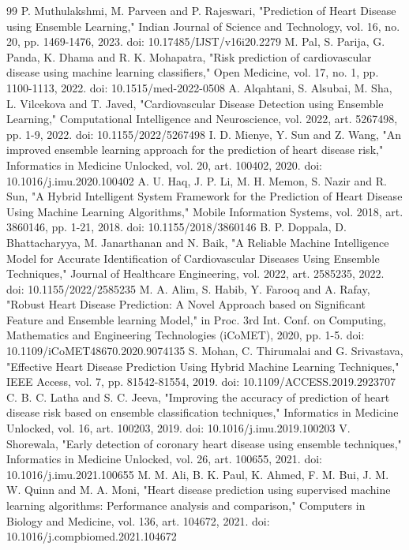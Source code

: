 \documentclass[conference,a4paper,10pt]{IEEEtran}
\begin{document}
\begin{thebibliography}{99}
 P. Muthulakshmi, M. Parveen and P. Rajeswari, "Prediction of Heart Disease using Ensemble Learning," Indian Journal of Science and Technology, vol. 16, no. 20, pp. 1469-1476, 2023. doi: 10.17485/IJST/v16i20.2279
 M. Pal, S. Parija, G. Panda, K. Dhama and R. K. Mohapatra, "Risk prediction of cardiovascular disease using machine learning classifiers," Open Medicine, vol. 17, no. 1, pp. 1100-1113, 2022. doi: 10.1515/med-2022-0508
 A. Alqahtani, S. Alsubai, M. Sha, L. Vilcekova and T. Javed, "Cardiovascular Disease Detection using Ensemble Learning," Computational Intelligence and Neuroscience, vol. 2022, art. 5267498, pp. 1-9, 2022. doi: 10.1155/2022/5267498
 I. D. Mienye, Y. Sun and Z. Wang, "An improved ensemble learning approach for the prediction of heart disease risk," Informatics in Medicine Unlocked, vol. 20, art. 100402, 2020. doi: 10.1016/j.imu.2020.100402
 A. U. Haq, J. P. Li, M. H. Memon, S. Nazir and R. Sun, "A Hybrid Intelligent System Framework for the Prediction of Heart Disease Using Machine Learning Algorithms," Mobile Information Systems, vol. 2018, art. 3860146, pp. 1-21, 2018. doi: 10.1155/2018/3860146
 B. P. Doppala, D. Bhattacharyya, M. Janarthanan and N. Baik, "A Reliable Machine Intelligence Model for Accurate Identification of Cardiovascular Diseases Using Ensemble Techniques," Journal of Healthcare Engineering, vol. 2022, art. 2585235, 2022. doi: 10.1155/2022/2585235
 M. A. Alim, S. Habib, Y. Farooq and A. Rafay, "Robust Heart Disease Prediction: A Novel Approach based on Significant Feature and Ensemble learning Model," in Proc. 3rd Int. Conf. on Computing, Mathematics and Engineering Technologies (iCoMET), 2020, pp. 1-5. doi: 10.1109/iCoMET48670.2020.9074135
 S. Mohan, C. Thirumalai and G. Srivastava, "Effective Heart Disease Prediction Using Hybrid Machine Learning Techniques," IEEE Access, vol. 7, pp. 81542-81554, 2019. doi: 10.1109/ACCESS.2019.2923707
 C. B. C. Latha and S. C. Jeeva, "Improving the accuracy of prediction of heart disease risk based on ensemble classification techniques," Informatics in Medicine Unlocked, vol. 16, art. 100203, 2019. doi: 10.1016/j.imu.2019.100203
 V. Shorewala, "Early detection of coronary heart disease using ensemble techniques," Informatics in Medicine Unlocked, vol. 26, art. 100655, 2021. doi: 10.1016/j.imu.2021.100655
 M. M. Ali, B. K. Paul, K. Ahmed, F. M. Bui, J. M. W. Quinn and M. A. Moni, "Heart disease prediction using supervised machine learning algorithms: Performance analysis and comparison," Computers in Biology and Medicine, vol. 136, art. 104672, 2021. doi: 10.1016/j.compbiomed.2021.104672

\end{thebibliography}
\end{document}
